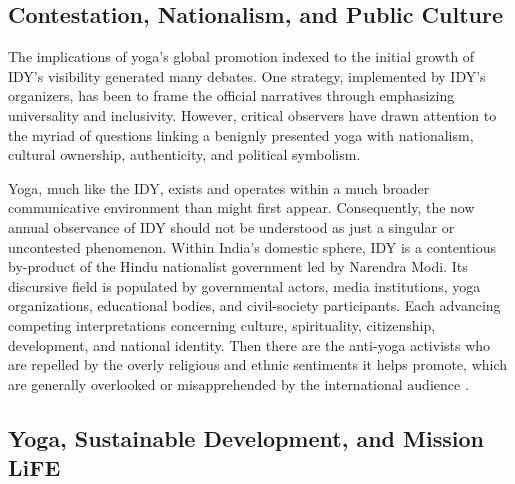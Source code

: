 \documentclass[11pt]{article}
\begin{document}
\subsection{Contestation, Nationalism, and Public Culture}
The implications of yoga's global promotion indexed to the initial growth of IDY's visibility generated many debates. One strategy, implemented by IDY's organizers, has been to frame the official narratives through emphasizing universality and inclusivity. However, critical observers have drawn attention to the myriad of questions linking a benignly presented yoga with  nationalism, cultural ownership, authenticity, and political symbolism.

Yoga, much like the IDY, exists and operates within a much broader communicative environment than might first appear. Consequently, the now annual observance of IDY should not be understood as just a singular or uncontested phenomenon. Within India's domestic sphere, IDY is a contentious by-product of the Hindu nationalist government led by Narendra Modi. Its discursive field is populated by governmental actors, media institutions, yoga organizations, educational bodies, and civil-society participants. Each advancing competing interpretations concerning culture, spirituality, citizenship, development, and national identity. Then there are the anti-yoga activists who are repelled by the overly religious and ethnic sentiments it helps promote, which are generally overlooked or misapprehended by the international audience \cite{merkel2015,otto2025,chandra2026}.

\subsection{Yoga, Sustainable Development, and Mission LiFE}
\end{document}
